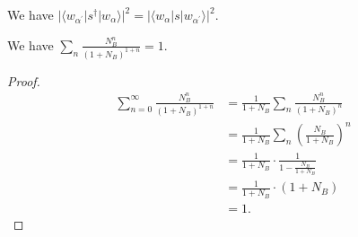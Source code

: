 \documentclass[../../note.tex]{subfiles}
\begin{document}
\begin{lemma}
    We have $\vert \langle w_{\alpha^\prime} \vert s^\dagger \vert w_{\alpha} \rangle \vert^2 = \vert \langle w_{\alpha} \vert s \vert w_{\alpha^\prime} \rangle \vert^2$.
\end{lemma}

\begin{lemma}
    We have $\sum_{n} \frac{N_B^n}{(1 + N_B)^{1+n}} = 1$.
\end{lemma}
\begin{proof}
    \begin{align}
        \sum_{n=0}^{\infty} \frac{N_B^n}{(1 + N_B)^{1+n}}
        &= \frac{1}{1+N_B} \sum_{n} \frac{N_B^n}{(1+N_B)^n} \\
        &= \frac{1}{1+N_B} \sum_n \left(\frac{N_B}{1+N_B}\right)^n \\
        &= \frac{1}{1+N_B} \cdot \frac{1}{1 - \frac{N_B}{1+N_B}} \\
        &= \frac{1}{1+N_B} \cdot (1 + N_B) \\
        &= 1.
    \end{align}
\end{proof}
\end{document}
